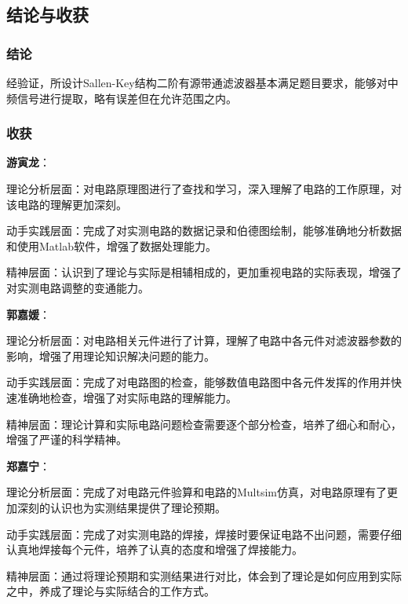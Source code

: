 \documentclass[./测控三级项目.tex]{subfiles} %
\begin{document}
	\subsection{结论与收获}
		\subsubsection{结论}
		经验证，所设计Sallen-Key结构二阶有源带通滤波器基本满足题目要求，能够对中频信号进行提取，略有误差但在允许范围之内。
		\subsubsection{收获}
		\textbf{游寅龙}：\par
		理论分析层面：对电路原理图进行了查找和学习，深入理解了电路的工作原理，对该电路的理解更加深刻。\par
		动手实践层面：完成了对实测电路的数据记录和伯德图绘制，能够准确地分析数据和使用Matlab软件，增强了数据处理能力。\par
		精神层面：认识到了理论与实际是相辅相成的，更加重视电路的实际表现，增强了对实测电路调整的变通能力。\par
		\textbf{郭嘉媛}：\par
		理论分析层面：对电路相关元件进行了计算，理解了电路中各元件对滤波器参数的影响，增强了用理论知识解决问题的能力。\par
		动手实践层面：完成了对电路图的检查，能够数值电路图中各元件发挥的作用并快速准确地检查，增强了对实际电路的理解能力。\par
		精神层面：理论计算和实际电路问题检查需要逐个部分检查，培养了细心和耐心，增强了严谨的科学精神。\par
		\textbf{郑嘉宁}：\par
		理论分析层面：完成了对电路元件验算和电路的Multsim仿真，对电路原理有了更加深刻的认识也为实测结果提供了理论预期。\par
		动手实践层面：完成了对实测电路的焊接，焊接时要保证电路不出问题，需要仔细认真地焊接每个元件，培养了认真的态度和增强了焊接能力。\par
		精神层面：通过将理论预期和实测结果进行对比，体会到了理论是如何应用到实际之中，养成了理论与实际结合的工作方式。
		
	
	
\end{document}
